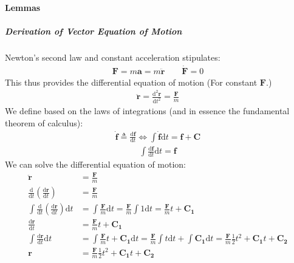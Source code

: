 \documentclass[letterpaper,11pt,english]{sphinxmanual}
\begin{document}
\paragraph{Lemmas}
\label{\detokenize{technical/algorithms/spherical_kinematics:lemmas}}

\subparagraph{Derivation of Vector Equation of Motion}
\label{\detokenize{technical/algorithms/spherical_kinematics:derivation-of-vector-equation-of-motion}}
\sphinxAtStartPar
Newton’s second law and constant acceleration stipulates:
\begin{equation*}
\begin{split}\mathbf{F} = m \mathbf{a} = m \ddot{\mathbf{r}} \qquad \dot{\mathbf{F}} = 0\end{split}
\end{equation*}
\sphinxAtStartPar
This thus provides the differential equation of motion (For constant \(\mathbf{F}\).)
\begin{equation*}
\begin{split}\ddot{\mathbf{r}} = \frac{\mathrm{d}^2\mathbf{r}}{\mathrm{d}t^2} = \frac{\mathbf{F}}{m}\end{split}
\end{equation*}
\sphinxAtStartPar
We define based on the laws of integrations (and in essence the fundamental
theorem of calculus):
\begin{equation*}
\begin{split}\dot{\mathbf{f}} \triangleq \frac{\mathrm{d}\mathbf{f}}{\mathrm{d}t} \Longleftrightarrow \int \dot{\mathbf{f}} \mathrm{d} t = \mathbf{f} + \mathbf{C}\end{split}
\end{equation*}\begin{equation*}
\begin{split}\int \frac{\mathrm{d}\mathbf{f}}{\mathrm{d}t} \mathrm{d} t = \mathbf{f}\end{split}
\end{equation*}
\sphinxAtStartPar
We can solve the differential equation of motion:
\begin{equation*}
\begin{split}\ddot{\mathbf{r}} &= \frac{\mathbf{F}}{m} \\
\frac{\mathrm{d}}{\mathrm{d}t} \left( \frac{\mathrm{d}\mathbf{r}}{\mathrm{d}t} \right) &= \frac{\mathbf{F}}{m} \\
\int \frac{\mathrm{d}}{\mathrm{d}t} \left( \frac{\mathrm{d}\mathbf{r}}{\mathrm{d}t} \right) \mathrm{d}t &= \int \frac{\mathbf{F}}{m} \mathrm{d}t = \frac{\mathbf{F}}{m} \int 1 \mathrm{d}t = \frac{\mathbf{F}}{m} t + \mathbf{C_1} \\
\frac{\mathrm{d}\mathbf{r}}{\mathrm{d}t} &= \frac{\mathbf{F}}{m} t + \mathbf{C_1} \\
\int \frac{\mathrm{d}\mathbf{r}}{\mathrm{d}t} \mathrm{d}t &= \int \frac{\mathbf{F}}{m} t + \mathbf{C_1} \mathrm{d}t = \frac{\mathbf{F}}{m} \int t \mathrm{d}t + \int \mathbf{C_1} \mathrm{d}t = \frac{\mathbf{F}}{m} \frac{1}{2} t^2 + \mathbf{C_1} t + \mathbf{C_2} \\
\mathbf{r} &= \frac{\mathbf{F}}{m} \frac{1}{2} t^2 + \mathbf{C_1} t + \mathbf{C_2}\end{split}
\end{equation*}
\end{document}

